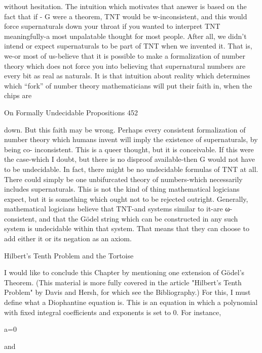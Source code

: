 without hesitation. The intuition which motivates that answer is based on the fact that if -
G were a theorem, TNT would be w-inconsistent, and this would force supernaturals
down your throat if you wanted to interpret TNT meaningfully-a most unpalatable
thought for most people. After all, we didn't intend or expect supernaturals to be part of
TNT when we invented it. That is, we-or most of us-believe that it is possible to make a
formalization of number theory which does not force you into believing that supernatural
numbers are every bit as real as naturals. It is that intuition about reality which
determines which “fork” of number theory mathematicians will put their faith in, when
the chips are




On Formally Undecidable Propositions                                                    452

down. But this faith may be wrong. Perhaps every consistent formalization of number
theory which humans invent will imply the existence of supernaturals, by being co-
inconsistent. This is a queer thought, but it is conceivable.
       If this were the case-which I doubt, but there is no disproof available-then G
would not have to be undecidable. In fact, there might be no undecidable formulas of
TNT at all. There could simply be one unbifurcated theory of numbers-which necessarily
includes supernaturals. This is not the kind of thing mathematical logicians expect, but it
is something which ought not to be rejected outright. Generally, mathematical logicians
believe that TNT-and systems similar to it-are ω-consistent, and that the Gödel string
which can be constructed in any such system is undecidable within that system. That
means that they can choose to add either it or its negation as an axiom.

                          Hilbert's Tenth Problem and the Tortoise

        I would like to conclude this Chapter by mentioning one extension of Gödel’s
Theorem. (This material is more fully covered in the article "Hilbert's Tenth Problem" by
Davis and Hersh, for which see the Bibliography.) For this, I must define what a
Diophantine equation is. This is an equation in which a polynomial with fixed integral
coefficients and exponents is set to 0. For instance,

                                                    a=0

                                                    and

